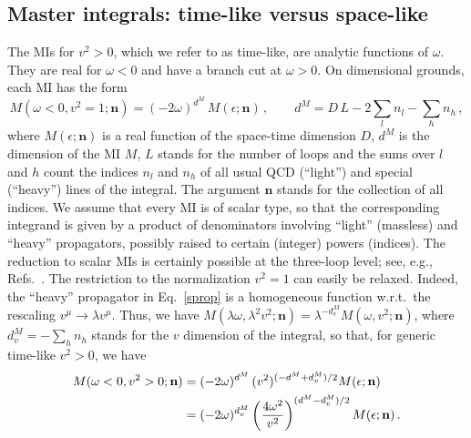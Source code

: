 \documentclass[12pt]{article}
\numberwithin{equation}{section}
\newcommand{\1}[1]{\mathbf{1}^{#1}}
\newcommand{\2}[1]{\mathbf{2}^{#1}}
\newcommand{\3}[1]{\mathbf{3}^{#1}}
\newcommand{\4}[1]{\mathbf{4}^{#1}}
\newcommand{\5}[1]{\mathbf{5}^{#1}}
\newcommand{\mlabel}[1]{ \text{\footnotesize \hspace{3mm}\fbox{\fbox{$#1$}} \label{#1}}}
\renewcommand{\mlabel}[1]{\label{#1}}
\newcommand{\ep}{\epsilon}
\newcommand{\vv}{v^2}
\begin{document}
\subsection{Master integrals: time-like versus space-like \mlabel{MIs}}
The MIs for $\vv >0$, which we refer to as time-like, are analytic
functions of $\omega$. They are real for $\omega <0$ and have  
a branch cut at $\omega>0$.
On dimensional grounds, each MI has the form
\begin{equation} M(\omega < 0, \vv = 1; \mathbf{n}) = (-2\omega)^{d^M}\, M(\ep; \mathbf{n}) \,,\qquad
d^{M} = D\, L  - 2\sum_l n_l - \sum_h n_h \,,
\end{equation}
where $M(\ep; \mathbf{n})$ is a real function of the space-time dimension
$D$, $d^{M}$ is the dimension of the MI $M$, $L$ stands for the number of loops and the sums over $l$ and $h$ count the indices $n_l$ and $n_h$ of all usual QCD (``light'') and special (``heavy'') 
lines of the integral. 
The argument ${\mathbf n}$ stands for the collection of all indices. 
We assume that every MI is of scalar type, so that the corresponding 
integrand is given by a product of denominators involving 
``light'' (massless) and ``heavy'' propagators, possibly raised to certain (integer) powers (indices). 
The reduction to scalar MIs is certainly possible at the three-loop level; see, e.g., Refs.~\cite{Grozin:2000jv,Chetyrkin:2003vi}.
The restriction to the normalization $\vv =1$ can easily be relaxed.
Indeed, the ``heavy'' propagator in Eq.~\eqref{sprop} is a homogeneous function w.r.t.\ the
rescaling  $v^\mu \to \lambda v^\mu$. Thus, we have
$M(\lambda\omega,\lambda^2\vv;\mathbf{n}) = \lambda^{-d^M_v}
M(\omega,\vv;\mathbf{n})$,
where $d^M_v = - \sum_h n_h$ stands for the $v$ dimension of the integral, 
so that, for generic time-like $\vv>0$, we have   
\begin{align}
M(\omega < 0, \vv >0; \mathbf{n}) &= (-2\omega)^{d^M} \, (\vv)^{(-d^M + d^M_v)/2}  M(\ep; \mathbf{n})
\notag\\&=
 (-2\omega )^{d^M_v} \left(\frac{4\omega^2}{\vv}\right)^{(d^M - d^M_v)/2} M(\ep;\mathbf{n})\,. 
\mlabel{Mt.generic}
\end{align}
\end{document}

